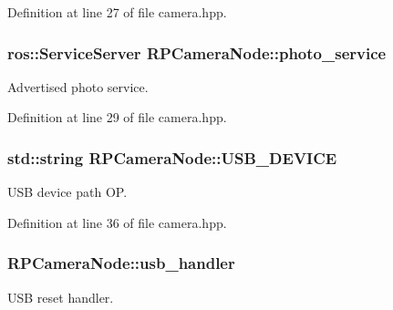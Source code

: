 \-Definition at line 27 of file camera.\-hpp.

\hypertarget{class_r_p_camera_node_ac8cd380063cf5cc9db19a74845e3f008}{
\subsubsection[{photo\-\_\-service}]{\setlength{\rightskip}{0pt plus 5cm}ros\-::\-Service\-Server {\bf \-R\-P\-Camera\-Node\-::photo\-\_\-service}}}\label{class_r_p_camera_node_ac8cd380063cf5cc9db19a74845e3f008}
\-Advertised photo service. 

\-Definition at line 29 of file camera.\-hpp.

\hypertarget{class_r_p_camera_node_a5d6be82d1ecbd5cd8dab19c863c8df05}{
\subsubsection[{\-U\-S\-B\-\_\-\-D\-E\-V\-I\-C\-E}]{\setlength{\rightskip}{0pt plus 5cm}std\-::string {\bf \-R\-P\-Camera\-Node\-::\-U\-S\-B\-\_\-\-D\-E\-V\-I\-C\-E}}}\label{class_r_p_camera_node_a5d6be82d1ecbd5cd8dab19c863c8df05}
\-U\-S\-B device path \-O\-P. 

\-Definition at line 36 of file camera.\-hpp.

\hypertarget{class_r_p_camera_node_aba586a055ce660b850a578150aae1eb7}{
\subsubsection[{usb\-\_\-handler}]{ {\bf \-R\-P\-Camera\-Node\-::usb\-\_\-handler}}}\label{class_r_p_camera_node_aba586a055ce660b850a578150aae1eb7}
\-U\-S\-B reset handler. 

